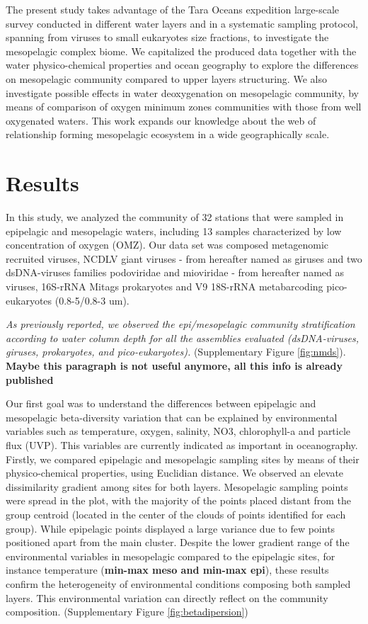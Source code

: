 \documentclass[fleqn,10pt]{wlscirep}
\begin{document}
The present study takes advantage of the Tara Oceans expedition large-scale survey conducted in different water layers and in a systematic sampling protocol, spanning from viruses to small eukaryotes size fractions, to investigate the mesopelagic complex biome. We capitalized the produced data together with the water physico-chemical properties and ocean geography to explore the differences on mesopelagic community compared to upper layers structuring. We also investigate possible effects in water deoxygenation on mesopelagic community, by means of comparison of oxygen minimum zones communities with those from well oxygenated waters. This work expands our knowledge about the web of relationship forming mesopelagic ecosystem in a wide geographically scale.

\section*{Results}

In this study, we analyzed the community of 32 stations that were sampled in epipelagic and mesopelagic waters, including 13 samples characterized by low concentration of oxygen (OMZ). Our data set was composed metagenomic recruited viruses, NCDLV giant viruses - from hereafter named as giruses and two dsDNA-viruses families podoviridae and mioviridae - from hereafter named as viruses, 16S-rRNA Mitags prokaryotes and V9 18S-rRNA metabarcoding pico-eukaryotes (0.8-5/0.8-3 um).

\textit{As previously reported, we observed the epi/mesopelagic community stratification according to water column depth for all the assemblies evaluated (dsDNA-viruses, giruses, prokaryotes, and pico-eukaryotes).}  (Supplementary Figure \ref{fig:nmds}). \textbf{Maybe this paragraph is not useful anymore, all this info is already published}

Our first goal was to understand the differences between epipelagic and mesopelagic beta-diversity variation that can be explained by environmental variables such as temperature, oxygen, salinity, NO3, chlorophyll-a and particle flux (UVP). This variables are currently indicated as important in oceanography. Firstly, we compared epipelagic and mesopelagic sampling sites by means of their physico-chemical properties, using Euclidian distance. We observed an elevate dissimilarity gradient among sites for both layers. Mesopelagic sampling points were spread in the plot, with the majority of the points placed distant from the group centroid (located in the center of the clouds of points identified for each group). While epipelagic points displayed a large variance due to few points positioned apart from the main cluster. Despite the lower gradient range of the environmental variables in mesopelagic compared to the epipelagic sites, for instance temperature (\textbf{min-max meso and min-max epi}), these results confirm the heterogeneity of environmental conditions composing both sampled layers. This environmental variation can directly reflect on the community composition.  (Supplementary Figure \ref{fig:betadipersion})
\end{document}
